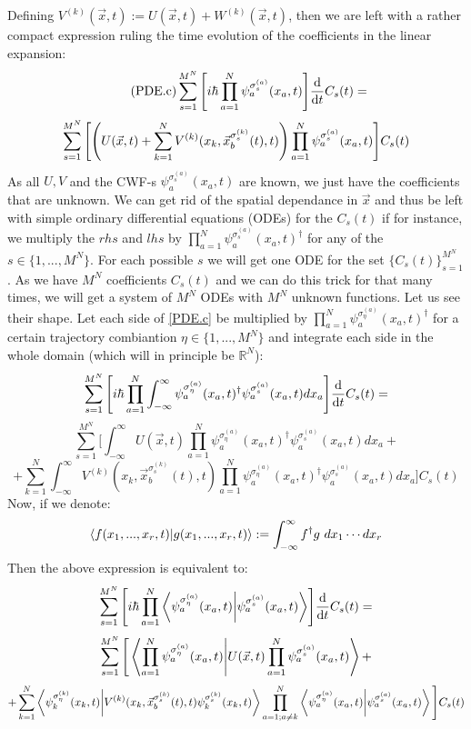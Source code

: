 \documentclass[11pt, a4paper]{article} %
\newcommand{\R}{\mathbb{R}} %
\begin{document}
Defining $V^{(k)}(\vec{x},t):=U(\vec{x},t)+W^{(k)}(\vec{x},t)$, then we are left with a rather compact expression ruling the time evolution of the coefficients in the linear expansion:
\begin{equation}\label{PDE.c}\tag{PDE.c}
\sum_{s=1}^{M^N} \qty[i\hbar \prod_{a=1}^N  \psi_a^{\sigma_s^{(a)}}(x_a,t)] \dv{}{t}C_s(t) = 
\end{equation}
$$
\sum_{s=1}^{M^N} \qty[\qty( U(\vec{x},t)+\sum_{k=1}^N V^{(k)}(x_k, \vec{x}^{\sigma_s^{(k)}}_b(t),t))\prod_{a=1}^N \psi_a^{\sigma_s^{(a)}}(x_a,t)]C_s(t)
$$
As all $U, V$ and the CWF-s $\psi_a^{\sigma_s^{(a)}}(x_a,t)$ are known, we just have the coefficients that are unknown. We can get rid of the spatial dependance in $\vec{x}$ and thus be left with simple ordinary differential equations (ODEs) for the $C_s(t)$ if for instance, we multiply the $rhs$ and $lhs$ by $\prod_{a=1}^N \psi_a^{\sigma_s^{(a)}}(x_a,t)^\dagger$ for any of the $s\in \{1,...,M^N\}$. For each possible $s$ we will get one ODE for the set $\{C_s(t)\}_{s=1}^{M^N}$. As we have $M^N$ coefficients $C_s(t)$ and we can do this trick for that many times, we will get a system of $M^N$ ODEs with $M^N$ unknown functions. Let us see their shape. Let each side of \ref{PDE.c} be multiplied by $\prod_{a=1}^N \psi_a^{\sigma_\eta^{(a)}}(x_a,t)^\dagger$ for a certain trajectory combiantion $\eta\in\{1,...,M^N \}$ and integrate each side in the whole domain (which will in principle be $\R^N$):
$$
\sum_{s=1}^{M^N} \qty[i\hbar \prod_{a=1}^N  \int_{-\infty}^\infty \psi_a^{\sigma_\eta^{(a)}}(x_a,t)^\dagger \psi_a^{\sigma_s^{(a)}}(x_a,t)dx_a] \dv{}{t}C_s(t) = 
$$
$$
\sum_{s=1}^{M^N} \Bigg[ \int_{-\infty}^\infty U(\vec{x},t) \prod_{a=1}^N \psi_a^{\sigma_\eta^{(a)}}(x_a,t)^\dagger \psi_a^{\sigma_s^{(a)}}(x_a,t)dx_a+
$$
$$
+\sum_{k=1}^N \int_{-\infty}^\infty V^{(k)}(x_k, \vec{x}^{\sigma_s^{(k)}}_b(t),t) \prod_{a=1}^N \psi_a^{\sigma_\eta^{(a)}}(x_a,t)^\dagger \psi_a^{\sigma_s^{(a)}}(x_a,t)dx_a\Bigg]C_s(t)
$$
Now, if we denote:
$$
\bra{f(x_1,...,x_r,t)}\ket{g(x_1,...,x_r,t)}:=\int_{-\infty}^\infty f^\dagger g\ dx_1\cdots dx_r
$$
Then the above expression is equivalent to:
$$
\sum_{s=1}^{M^N} \qty[i\hbar \prod_{a=1}^N  \bra{\psi_a^{\sigma_\eta^{(a)}}(x_a,t)}\ket{\psi_a^{\sigma_s^{(a)}}(x_a,t)}] \dv{}{t}C_s(t) = 
$$
$$
\sum_{s=1}^{M^N} \Bigg[\bra{\prod_{a=1}^N  \psi_a^{\sigma_\eta^{(a)}}(x_a,t)}\ket{U(\vec{x},t)  \prod_{a=1}^N \psi_a^{\sigma_s^{(a)}}(x_a,t)}+
$$
$$
+\sum_{k=1}^N\bra{\psi_k^{\sigma_\eta^{(k)}}(x_k,t)}\ket{V^{(k)}(x_k,\vec{x}_b^{\sigma_s^{(k)}}(t),t) \psi_k^{\sigma_s^{(k)}}(x_k,t)} \prod_{a=1;a\neq k}^N  \bra{\psi_a^{\sigma_\eta^{(a)}}(x_a,t)}\ket{\psi_a^{\sigma_s^{(a)}}(x_a,t)}  \Bigg]C_s(t)
$$
\end{document}
